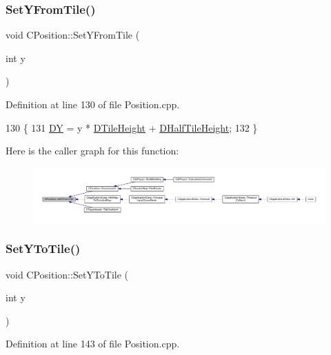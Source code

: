 \subsubsection{\texorpdfstring{Set\+Y\+From\+Tile()}{SetYFromTile()}}
{\footnotesize\ttfamily void C\+Position\+::\+Set\+Y\+From\+Tile (\begin{DoxyParamCaption}\item[{int}]{y }\end{DoxyParamCaption})}



Definition at line 130 of file Position.\+cpp.


\begin{DoxyCode}
130                                  \{
131     \hyperlink{classCPosition_a84139c9e8eb547e7cf3cb851739943a4}{DY} = y * \hyperlink{classCPosition_a202ebb83e86df75cfb76cf1241ba817c}{DTileHeight} + \hyperlink{classCPosition_a1e0af68f7690b3cfc14687cf7fbe7ade}{DHalfTileHeight};
132 \}
\end{DoxyCode}
Here is the caller graph for this function\+:\nopagebreak
\begin{figure}[H]
\begin{center}
\leavevmode
\includegraphics[width=350pt]{classCPosition_a4be1caa5ce58297e9d371f6bc1db32d9_icgraph}
\end{center}
\end{figure}
\hypertarget{classCPosition_a5805485f623398197ac595a5d389f691}{}\label{classCPosition_a5805485f623398197ac595a5d389f691} 
\subsubsection{\texorpdfstring{Set\+Y\+To\+Tile()}{SetYToTile()}}
{\footnotesize\ttfamily void C\+Position\+::\+Set\+Y\+To\+Tile (\begin{DoxyParamCaption}\item[{int}]{y }\end{DoxyParamCaption})}



Definition at line 143 of file Position.\+cpp.


